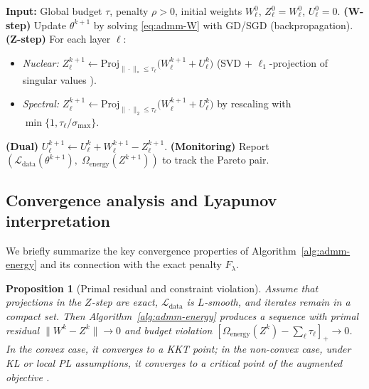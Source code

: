 \documentclass[a4paper,fleqn]{cas-sc}
\newtheorem{proposition}[theorem]{Proposition}
\theoremstyle{remark}
\theoremstyle{definition}
\begin{document}
\begin{algorithm}[t]
\caption{ADMM with a global nuclear-norm energy budget}
\label{alg:admm-energy}
\begin{algorithmic}[1]
\State \textbf{Input:} Global budget $\tau$, penalty $\rho>0$, initial weights $W_\ell^0$, $Z_\ell^0=W_\ell^0$, $U_\ell^0=0$.
  \State \textbf{(W-step)} Update $\theta^{k+1}$ by solving \eqref{eq:admm-W} with GD/SGD (backpropagation).
  \State \textbf{(Z-step)} For each layer $\ell$:
    \begin{itemize}
      \item \emph{Nuclear:} $Z_\ell^{k+1} \gets \mathrm{Proj}_{\|\cdot\|_{*}\le \tau_\ell}
      \big(W_\ell^{k+1}+U_\ell^{k}\big)$ (SVD + $\ell_1$-projection of singular values \cite{Duchi2008L1proj}).
      \item \emph{Spectral:} $Z_\ell^{k+1} \gets \mathrm{Proj}_{\|\cdot\|_2\le \tau_\ell}
      \big(W_\ell^{k+1}+U_\ell^{k}\big)$ by rescaling with $\min\{1,\tau_\ell/\sigma_{\max}\}$.
    \end{itemize}
  \State \textbf{(Dual)} $U_\ell^{k+1}\gets U_\ell^{k}+W_\ell^{k+1}-Z_\ell^{k+1}$.
  \State \textbf{(Monitoring)} Report $(\mathcal{L}_{\text{data}}(\theta^{k+1}),\;\Omega_{\text{energy}}(Z^{k+1}))$ to track the Pareto pair.
\EndFor
\end{algorithmic}
\end{algorithm}

\subsection{Convergence analysis and Lyapunov interpretation}

We briefly summarize the key convergence properties of Algorithm~\ref{alg:admm-energy} and its connection with the exact penalty $F_\lambda$.

\begin{proposition}[Primal residual and constraint violation]\label{prop:residuo}
Assume that projections in the $Z$-step are exact, $\mathcal{L}_{\text{data}}$ is $L$-smooth, and iterates remain in a compact set. Then Algorithm~\ref{alg:admm-energy} produces a sequence with primal residual $\|W^k-Z^k\|\to 0$ and budget violation $[\Omega_{\text{energy}}(Z^k)-\sum_\ell\tau_\ell]_+\to 0$. In the convex case, it converges to a KKT point; in the non-convex case, under KL or local PL assumptions, it converges to a critical point of the augmented objective \cite{Boyd2011ADMM,HeYuan2012ADMM,Attouch2013KL,Reddi2016ADMMnonconvex}.
\end{proposition}
\end{document}
